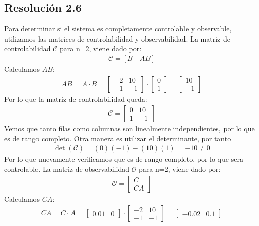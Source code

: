 \documentclass[
  11pt,
  letterpaper,
   addpoints,
   answers
  ]{exam}
\begin{document}
\begin{solution}
\subsection*{Resolución 2.6}
Para determinar si el sistema es completamente controlable y observable, utilizamos las matrices de controlabilidad y observabilidad. La matriz de controlabilidad $ \mathcal{C} $ para n=2, viene dado por:
\begin{align}
\mathcal{C} = [B \quad AB]
\end{align}
Calculamos $AB$:
\begin{align}
AB = A \cdot B = \begin{bmatrix} -2 & 10
\\ -1 & -1 \end{bmatrix} \cdot \begin{bmatrix} 0 \\ 1 \end{bmatrix} = \begin{bmatrix} 10 \\ -1 \end{bmatrix}
\end{align}
Por lo que la matriz de controlabilidad queda:
\begin{align}
\mathcal{C} = \begin{bmatrix} 0 & 10 \\ 1 & -1 \end{bmatrix}
\end{align}
Vemos que tanto filas como columnas son linealmente independientes, por lo que es de rango completo. Otra manera es utilizar el determinante, por tanto
\begin{align}
\det(\mathcal{C}) = (0)(-1) - (10)(1) = -10 \neq 0
\end{align}
Por lo que nuevamente verificamos que es de rango completo, por lo que sera controlable. La matriz de observabilidad $ \mathcal{O} $ para n=2, viene dado por:
\begin{align}
\mathcal{O} = \begin{bmatrix} C \\ CA \end{bmatrix}
\end{align}
Calculamos $CA$:
\begin{align}
CA = C \cdot A = \begin{bmatrix} 0.01 & 0 \end{bmatrix} \cdot \begin{bmatrix} -2 & 10 \\ -1 & -1 \end{bmatrix} = \begin{bmatrix} -0.02 & 0.1 \end{bmatrix}

\end{align}
\end{solution}
\end{document}
